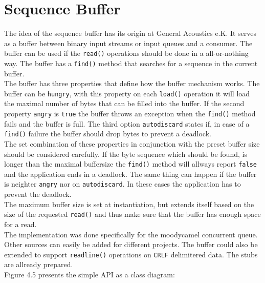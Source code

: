 \section{Sequence Buffer}
The idea of the sequence buffer has its origin at General Acoustics e.K. It serves as a buffer between binary input streams or input queues and a consumer. The buffer can be used if the \texttt{read()} operations should be done in a all-or-nothing way. The buffer has a \texttt{find()} method that searches for a sequence in the current buffer.\\
The buffer has three properties that define how the buffer mechanism works. The buffer can be \texttt{hungry}, with this property on each \texttt{load()} operation it will load the maximal number of bytes that can be filled into the buffer. If the second property \texttt{angry} is \texttt{true} the buffer throws an exception when the \texttt{find()} method fails and the buffer is full. The third option \texttt{autodiscard} states if, in case of a  \texttt{find()} failure the buffer should drop bytes to prevent a deadlock.\\
The set combination of these properties in conjunction with the preset buffer size should be considered carefully. If the byte sequence which should be found, is longer than the maximal buffersize the \texttt{find()} method will allways report \texttt{false} and the application ends in a deadlock. The same thing can happen if the buffer is neighter \texttt{angry} nor on \texttt{autodiscard}. In these cases the application has to prevent the deadlock.\\
The maximum buffer size is set at instantiation, but extends itself based on the size of the requested \texttt{read()} and thus make sure that the buffer has enough space for a read.\\
The implementation was done specifically for the moodycamel concurrent queue. Other sources can easily be added for different projects. The buffer could also be extended to support \texttt{readline()} operations on \texttt{CRLF} delimitered data. The stubs are allready prepared.\\
Figure 4.5 presents the simple API as a class diagram:

